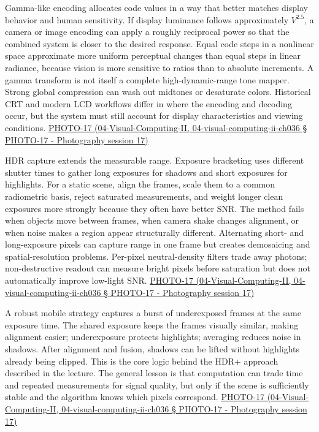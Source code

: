 Gamma-like encoding allocates code values in a way that better matches display behavior and human sensitivity. If display luminance follows approximately \(V^{2.5}\), a camera or image encoding can apply a roughly reciprocal power so that the combined system is closer to the desired response. Equal code steps in a nonlinear space approximate more uniform perceptual changes than equal steps in linear radiance, because vision is more sensitive to ratios than to absolute increments. A gamma transform is not itself a complete high-dynamic-range tone mapper. Strong global compression can wash out midtones or desaturate colors. Historical CRT and modern LCD workflows differ in where the encoding and decoding occur, but the system must still account for display characteristics and viewing conditions. \href{}{PHOTO-17 (04-Visual-Computing-II, 04-visual-computing-ii-ch036 § PHOTO-17 - Photography session 17)}

HDR capture extends the measurable range. Exposure bracketing uses different shutter times to gather long exposures for shadows and short exposures for highlights. For a static scene, align the frames, scale them to a common radiometric basis, reject saturated measurements, and weight longer clean exposures more strongly because they often have better SNR. The method fails when objects move between frames, when camera shake changes alignment, or when noise makes a region appear structurally different. Alternating short- and long-exposure pixels can capture range in one frame but creates demosaicing and spatial-resolution problems. Per-pixel neutral-density filters trade away photons; non-destructive readout can measure bright pixels before saturation but does not automatically improve low-light SNR. \href{}{PHOTO-17 (04-Visual-Computing-II, 04-visual-computing-ii-ch036 § PHOTO-17 - Photography session 17)}

A robust mobile strategy captures a burst of underexposed frames at the same exposure time. The shared exposure keeps the frames visually similar, making alignment easier; underexposure protects highlights; averaging reduces noise in shadows. After alignment and fusion, shadows can be lifted without highlights already being clipped. This is the core logic behind the HDR+ approach described in the lecture. The general lesson is that computation can trade time and repeated measurements for signal quality, but only if the scene is sufficiently stable and the algorithm knows which pixels correspond. \href{}{PHOTO-17 (04-Visual-Computing-II, 04-visual-computing-ii-ch036 § PHOTO-17 - Photography session 17)}

